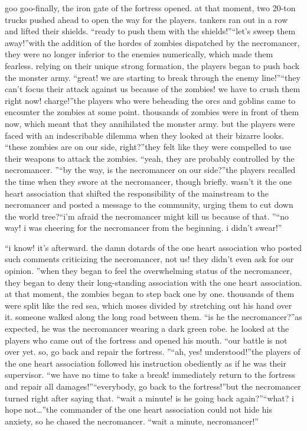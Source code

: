 goo goo-finally, the iron gate of the fortress opened.
 at that moment, two 20-ton trucks pushed ahead to open the way for the players.
 tankers ran out in a row and lifted their shields.
“ready to push them with the shields!”“let’s sweep them away!”with the addition of the hordes of zombies dispatched by the necromancer, they were no longer inferior to the enemies numerically, which made them fearless.
 relying on their unique strong formation, the players began to push back the monster army.
“great! we are starting to break through the enemy line!”“they can’t focus their attack against us because of the zombies! we have to crush them right now! charge!”the players who were beheading the orcs and goblins came to encounter the zombies at some point.
 thousands of zombies were in front of them now, which meant that they annihilated the monster army.
 but the players were faced with an indescribable dilemma when they looked at their bizarre looks.
“these zombies are on our side, right?”they felt like they were compelled to use their weapons to attack the zombies.
“yeah, they are probably controlled by the necromancer.
”“by the way, is the necromancer on our side?”the players recalled the time when they swore at the necromancer, though briefly.
wasn’t it the one heart association that shifted the responsibility of the mainstream to the necromancer and posted a message to the community, urging them to cut down the world tree?“i’m afraid the necromancer might kill us because of that.
”“no way! i was cheering for the necromancer from the beginning.
 i didn’t swear!”

“i know! it’s afterward.
 the damn dotards of the one heart association who posted such comments criticizing the necromancer, not us! they didn’t even ask for our opinion.
”when they began to feel the overwhelming status of the necromancer, they began to deny their long-standing association with the one heart association.
at that moment, the zombies began to step back one by one.
 thousands of them were split like the red sea, which moses divided by stretching out his hand over it.
someone walked along the long road between them.
“is he the necromancer?”as expected, he was the necromancer wearing a dark green robe.
 he looked at the players who came out of the fortress and opened his mouth.
“our battle is not over yet.
 so, go back and repair the fortress.
”“ah, yes! understood!”the players of the one heart association followed his instruction obediently as if he was their supervisor.
“we have no time to take a break! immediately return to the fortress and repair all damages!”“everybody, go back to the fortress!”but the necromancer turned right after saying that.
“wait a minute! is he going back again?”“what? i hope not…”the commander of the one heart association could not hide his anxiety, so he chased the necromancer.
“wait a minute, necromancer!”

 